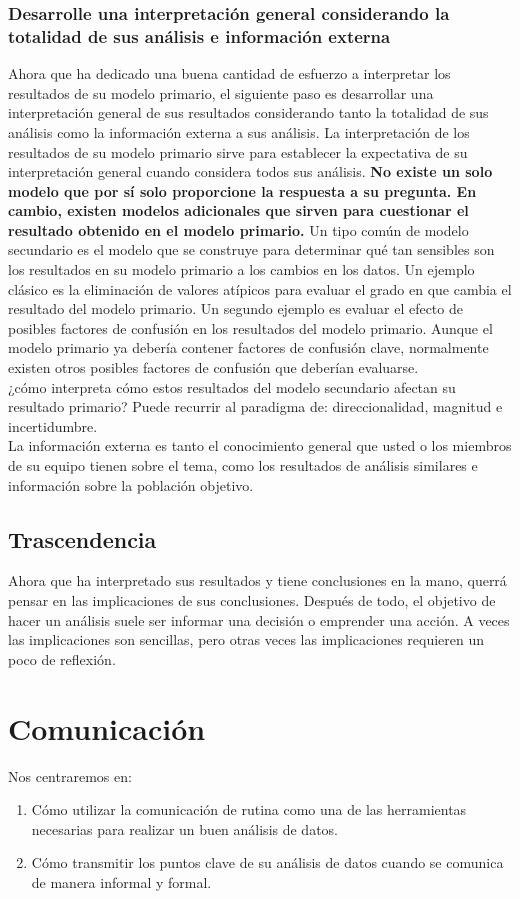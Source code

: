 \documentclass[10pt]{book}
\begin{document}
	\subsection{Desarrolle una interpretación general considerando la totalidad de sus análisis e información externa}
	Ahora que ha dedicado una buena cantidad de esfuerzo a interpretar los resultados de su modelo primario, el siguiente paso es desarrollar una interpretación general de sus resultados considerando tanto la totalidad de sus análisis como la información externa a sus análisis.  La interpretación de los resultados de su modelo primario sirve para establecer la expectativa de su interpretación general cuando considera todos sus análisis. \textbf{No existe un solo modelo que por sí solo proporcione la respuesta a su pregunta. En cambio, existen modelos adicionales que sirven para cuestionar el resultado obtenido en el modelo primario.} Un tipo común de modelo secundario es el modelo que se construye para determinar qué tan sensibles son los resultados en su modelo primario a los cambios en los datos. Un ejemplo clásico es la eliminación de valores atípicos para evaluar el grado en que cambia el resultado del modelo primario. Un segundo ejemplo es evaluar el efecto de posibles factores de confusión en los resultados del modelo primario. Aunque el modelo primario ya debería contener factores de confusión clave, normalmente existen otros posibles factores de confusión que deberían evaluarse. \\
	¿cómo interpreta cómo estos resultados del modelo secundario afectan su resultado primario? Puede recurrir al paradigma de: direccionalidad, magnitud e incertidumbre.\\
	La información externa es tanto el conocimiento general que usted o los miembros de su equipo tienen sobre el tema, como los resultados de análisis similares e información sobre la población objetivo. 
    \section{Trascendencia}
    Ahora que ha interpretado sus resultados y tiene conclusiones en la mano, querrá pensar en las implicaciones de sus conclusiones. Después de todo, el objetivo de hacer un análisis suele ser informar una decisión o emprender una acción. A veces las implicaciones son sencillas, pero otras veces las implicaciones requieren un poco de reflexión.
\chapter{Comunicación}
    Nos centraremos en:
    \begin{enumerate}[\bfseries 1.]
	\item Cómo utilizar la comunicación de rutina como una de las herramientas necesarias para realizar un buen análisis de datos.
	\item Cómo transmitir los puntos clave de su análisis de datos cuando se comunica de manera informal y formal.
    \end{enumerate}
\end{document}
